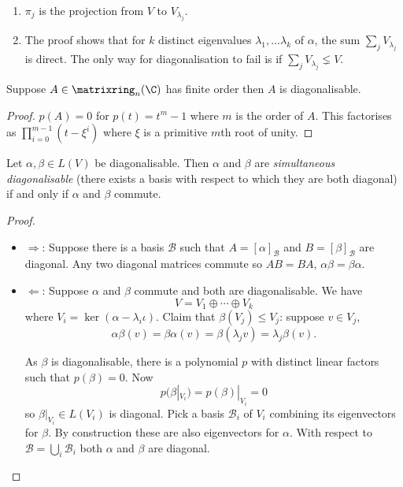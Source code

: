 \documentclass[a4paper]{article}
\newcommand*{\M}{\matrixring}
\newcommand*{\basis}{\mathcal}
\theoremstyle{definition}
\begin{document}
\begin{remark}\leavevmode
  \begin{enumerate}
  \item \(\pi_j\) is the projection from \(V\) to \(V_{\lambda_j}\).
  \item The proof shows that for \(k\) distinct eigenvalues \(\lambda_1, \dots \lambda_k\) of \(\alpha\), the sum \(\sum_j V_{\lambda_j}\) is direct. The only way for diagonalisation to fail is if \(\sum_j V_{\lambda_j} \lneq V\).
  \end{enumerate}
\end{remark}

\begin{corollary}
  Suppose \(A \in \M_n(\C)\) has finite order then \(A\) is diagonalisable. 
\end{corollary}

\begin{proof}
  \(p(A) = 0\) for \(p(t) = t^m - 1\) where \(m\) is the order of \(A\). This factorises as \(\prod_{i = 0}^{m - 1} (t - \xi^i)\) where \(\xi\) is a primitive \(m\)th root of unity.
\end{proof}

\begin{theorem}
  Let \(\alpha, \beta \in L(V)\) be diagonalisable. Then \(\alpha\) and \(\beta\) are \emph{simultaneous diagonalisable} (there exists a basis with respect to which they are both diagonal) if and only if \(\alpha\) and \(\beta\) commute.
\end{theorem}

\begin{proof}\leavevmode
  \begin{itemize}
  \item \(\Rightarrow\): Suppose there is a basis \(\basis B\) such that \(A = [\alpha]_{\basis B}\) and \(B = [\beta]_{\basis B}\) are diagonal. Any two diagonal matrices commute so \(AB = BA\), \(\alpha\beta = \beta\alpha\).
  \item \(\Leftarrow\): Suppose \(\alpha\) and \(\beta\) commute and both are diagonalisable. We have
    \[
      V = V_1 \oplus \cdots \oplus V_k
    \]
    where \(V_i = \ker(\alpha - \lambda_i\iota)\). Claim that \(\beta(V_j) \leq V_j\): suppose \(v \in V_j\),
    \[
      \alpha\beta (v) = \beta\alpha (v) = \beta(\lambda_j v) = \lambda_j \beta(v).
    \]

    As \(\beta\) is diagonalisable, there is a polynomial \(p\) with distinct linear factors such that \(p(\beta) = 0\). Now
    \[
      p(\beta|_{V_i}) = p(\beta)|_{V_i} = 0
    \]
    so \(\beta|_{V_i} \in L(V_i)\) is diagonal. Pick a basis \(\basis B_i\) of \(V_i\) combining its eigenvectors for \(\beta\). By construction these are also eigenvectors for \(\alpha\). With respect to \(\basis B = \bigcup_i \basis B_i\) both \(\alpha\) and \(\beta\) are diagonal.
  \end{itemize}
\end{proof}
\end{document}
